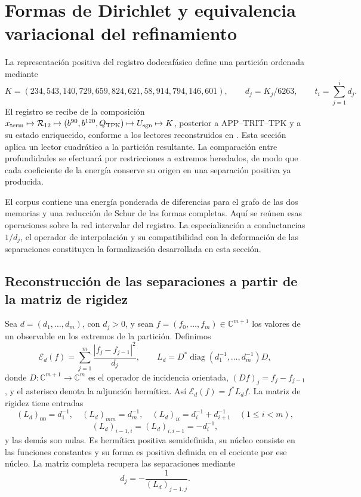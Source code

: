\section{Formas de Dirichlet y equivalencia variacional del refinamiento}
\label{sec:energia-refinamiento-k}

La representación positiva del registro dodecafásico define una partición
ordenada mediante
\[
 K=(234,543,140,729,659,824,621,58,914,794,146,601),
 \qquad d_j=K_j/6263,
 \qquad t_i=\sum_{j=1}^id_j.
\]
El registro se recibe de la composición
\(x_{\rm term}\mapsto\mathcal R_{12}\mapsto
(b^{90},b^{120},Q_{\rm TPK})\mapsto U_{\rm sgn}\mapsto K\),
posterior a APP--TRIT--TPK y a su estado enriquecido, conforme a los lectores
reconstruidos en \cite{hmtX}. Esta sección aplica
un lector cuadrático a la partición resultante. La comparación entre
profundidades se efectuará por restricciones a extremos heredados, de modo
que cada coeficiente de la energía conserve su origen en una separación
positiva ya producida.

El corpus contiene una energía ponderada de diferencias para el grafo de
las dos memorias y una reducción de Schur de las formas completas. Aquí se
reúnen esas operaciones sobre la red intervalar del registro. La
especialización a conductancias \(1/d_j\), el operador de interpolación
y su compatibilidad con la deformación de las separaciones constituyen
la formalización desarrollada en esta sección.

\subsection{Reconstrucción de las separaciones a partir de la matriz de rigidez}

Sea \(d=(d_1,\ldots,d_m)\), con \(d_j>0\), y sean
\(f=(f_0,\ldots,f_m)\in\mathbb C^{m+1}\) los valores de un observable
en los extremos de la partición. Definimos
\begin{equation}
 \mathcal E_d(f)=\sum_{j=1}^{m}\frac{|f_j-f_{j-1}|^2}{d_j},
 \qquad L_d=D^*\operatorname{diag}(d_1^{-1},\ldots,d_m^{-1})D,
 \label{eq:energia-intervalar}
\end{equation}
donde \(D:\mathbb C^{m+1}\to\mathbb C^m\) es el operador de
incidencia orientada, \((Df)_j=f_j-f_{j-1}\), y el asterisco denota la
adjunción hermítica. Así \(\mathcal E_d(f)=f^*L_df\).
La matriz de rigidez tiene entradas
\[
 (L_d)_{00}=d_1^{-1},\quad (L_d)_{mm}=d_m^{-1},\quad
 (L_d)_{ii}=d_i^{-1}+d_{i+1}^{-1}\quad(1\le i<m),
\]
\[
 (L_d)_{i-1,i}=(L_d)_{i,i-1}=-d_i^{-1},
\]
y las demás son nulas. Es hermítica positiva semidefinida, su núcleo
consiste en las funciones constantes y su forma es positiva definida
en el cociente por ese núcleo. La matriz completa recupera las
separaciones mediante
\begin{equation}
 d_j=-\frac1{(L_d)_{j-1,j}}.
 \label{eq:recuperacion-d-rigidez}
\end{equation}

